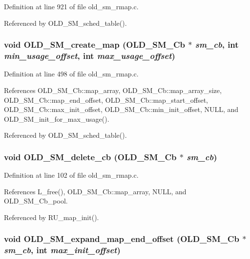 Definition at line 921 of file old\_\-sm\_\-rmap.c.

Referenced by OLD\_\-SM\_\-sched\_\-table().
\subsubsection{\setlength{\rightskip}{0pt plus 5cm}void OLD\_\-SM\_\-create\_\-map (\bf{OLD\_\-SM\_\-Cb} $\ast$ {\em sm\_\-cb}, int {\em min\_\-usage\_\-offset}, int {\em max\_\-usage\_\-offset})}\label{old__sm__rmap_8c_ca14bd7d089f3c11cf973af6fd7fe2c0}




Definition at line 498 of file old\_\-sm\_\-rmap.c.

References OLD\_\-SM\_\-Cb::map\_\-array, OLD\_\-SM\_\-Cb::map\_\-array\_\-size, OLD\_\-SM\_\-Cb::map\_\-end\_\-offset, OLD\_\-SM\_\-Cb::map\_\-start\_\-offset, OLD\_\-SM\_\-Cb::max\_\-init\_\-offset, OLD\_\-SM\_\-Cb::min\_\-init\_\-offset, NULL, and OLD\_\-SM\_\-init\_\-for\_\-max\_\-usage().

Referenced by OLD\_\-SM\_\-sched\_\-table().
\subsubsection{\setlength{\rightskip}{0pt plus 5cm}void OLD\_\-SM\_\-delete\_\-cb (\bf{OLD\_\-SM\_\-Cb} $\ast$ {\em sm\_\-cb})}\label{old__sm__rmap_8c_bba3da2bbe4aa10245598f765e55f45f}




Definition at line 102 of file old\_\-sm\_\-rmap.c.

References L\_\-free(), OLD\_\-SM\_\-Cb::map\_\-array, NULL, and OLD\_\-SM\_\-Cb\_\-pool.

Referenced by RU\_\-map\_\-init().
\subsubsection{\setlength{\rightskip}{0pt plus 5cm}void OLD\_\-SM\_\-expand\_\-map\_\-end\_\-offset (\bf{OLD\_\-SM\_\-Cb} $\ast$ {\em sm\_\-cb}, int {\em max\_\-init\_\-offset})}\label{old__sm__rmap_8c_28de85a9612fd3a1beab750ef2dd4173}




